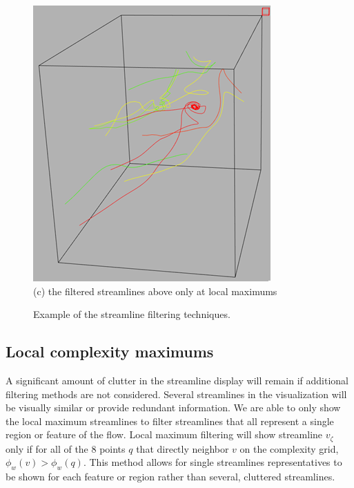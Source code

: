 \documentclass{egpubl}
\begin{document}
\begin{figure}[h]
\begin{minipage}{0.30\linewidth}
                        \includegraphics[height = 1.1\linewidth]{Images/max_vtk.png}\\(c) the filtered streamlines above only at local maximums \vspace{0.2em}
                \end{minipage}
        \caption{Example of the streamline filtering techniques.}
        \label{fig:value_filter}
\end{figure}

\subsection{Local complexity maximums}
A significant amount of clutter in the streamline display will remain if additional filtering methods are not considered.
Several streamlines in the visualization will be visually similar or provide redundant information.
We are able to only show the local maximum streamlines to filter streamlines that all represent a single region or feature of the flow.
Local maximum filtering will show streamline $v_\zeta$ only if for all of the 8 points $q$ that directly neighbor $v$ on the complexity grid, $\phi_w(v) > \phi_w(q)$.
This method allows for single streamlines representatives to be shown for each feature or region rather than several, cluttered streamlines.
\end{document}
